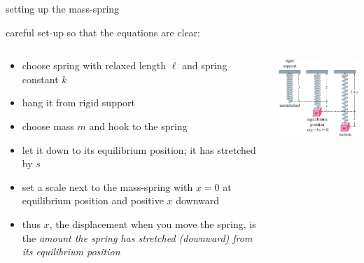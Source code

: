 \documentclass{beamer}
\begin{document}
\begin{frame}{setting up the mass-spring}

careful set-up so that the equations are clear:
\begin{columns}
\begin{column}{0.6\textwidth}
\begin{itemize}
\small
\item choose spring with relaxed length $\ell$ and spring constant $k$
\item hang it from rigid support
\item choose mass $m$ and hook to the spring
\item let it down to its equilibrium position; it has stretched by $s$
\item set a scale next to the mass-spring with $x=0$ at equilibrium position and positive $x$ downward
\item thus $x$, the displacement when you move the spring, is the \emph{amount the spring has stretched (downward) from its equilibrium position}
\end{itemize}
\end{column}
\begin{column}{0.4\textwidth}
\includegraphics[width=\textwidth]{figs/mass-spring-setup}
\end{column}
\end{columns}
\end{frame}
\end{document}

